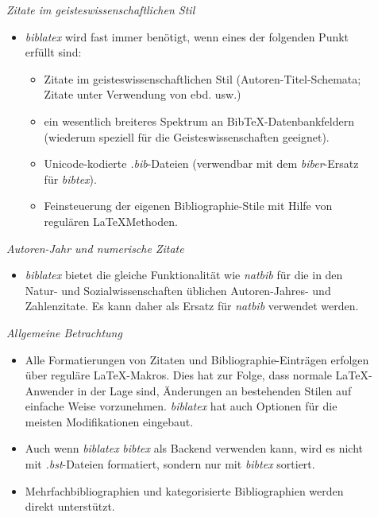 \begin{description}
	\item[] \emph{Zitate im geisteswissenschaftlichen Stil}
	\begin{itemize}
		\item \emph{biblatex} wird fast immer benötigt, wenn eines der folgenden Punkt erfüllt sind:
		\begin{itemize}
			\item Zitate im geisteswissenschaftlichen Stil (Autoren-Titel-Schemata; Zitate unter Verwendung von ebd. usw.)
			\item ein wesentlich breiteres Spektrum an BibTeX-Datenbankfeldern (wiederum speziell für die Geisteswissenschaften geeignet).
			\item Unicode-kodierte \emph{.bib}-Dateien (verwendbar mit dem \emph{biber}-Ersatz für \emph{bibtex}).
			\item Feinsteuerung der eigenen Bibliographie-Stile mit Hilfe von regulären \LaTeX Methoden.
		\end{itemize}
	\end{itemize}
	\item[] \emph{Autoren-Jahr und numerische Zitate}
	\begin{itemize}
		\item \emph{biblatex} bietet die gleiche Funktionalität wie \emph{natbib} für die in den Natur- und Sozialwissenschaften üblichen Autoren-Jahres- und Zahlenzitate. Es kann daher als Ersatz für \emph{natbib} verwendet werden.
	\end{itemize}
	\item[] \emph{Allgemeine Betrachtung}
	\begin{itemize}
		\item Alle Formatierungen von Zitaten und Bibliographie-Einträgen erfolgen über reguläre LaTeX-Makros. Dies hat zur Folge, dass normale LaTeX-Anwender in der Lage sind, Änderungen an bestehenden Stilen auf einfache Weise vorzunehmen. \emph{biblatex} hat auch Optionen für die meisten Modifikationen eingebaut.
		\item Auch wenn \emph{biblatex} \emph{bibtex} als Backend verwenden kann, wird es nicht mit \emph{.bst}-Dateien formatiert, sondern nur mit \emph{bibtex} sortiert.
		\item Mehrfachbibliographien und kategorisierte Bibliographien werden direkt unterstützt.
	\end{itemize}
\end{description}

